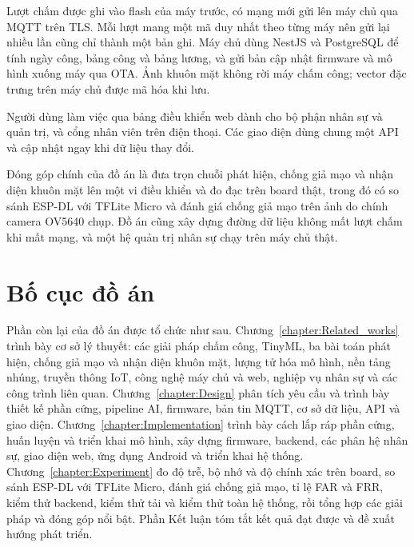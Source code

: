 \documentclass[../DoAn.tex]{subfiles}
\begin{document}
Lượt chấm được ghi vào flash của máy trước, có mạng mới gửi lên máy chủ qua
MQTT trên TLS. Mỗi lượt mang một mã duy nhất theo từng máy nên gửi lại nhiều lần
cũng chỉ thành một bản ghi. Máy chủ dùng NestJS và PostgreSQL để tính ngày công,
bảng công và bảng lương, và gửi bản cập nhật firmware và mô hình xuống máy qua
OTA. Ảnh khuôn mặt không rời máy chấm công; vector đặc trưng trên máy chủ được
mã hóa khi lưu.

Người dùng làm việc qua bảng điều khiển web dành cho bộ phận nhân sự và quản
trị, và cổng nhân viên trên điện thoại. Các giao diện dùng chung một API và cập
nhật ngay khi dữ liệu thay đổi.

Đóng góp chính của đồ án là đưa trọn chuỗi phát hiện, chống giả mạo và nhận diện
khuôn mặt lên một vi điều khiển và đo đạc trên board thật, trong đó có so sánh
ESP-DL với TFLite Micro và đánh giá chống giả mạo trên ảnh do chính camera OV5640
chụp. Đồ án cũng xây dựng đường dữ liệu không mất lượt chấm khi mất mạng, và một
hệ quản trị nhân sự chạy trên máy chủ thật.

\section{Bố cục đồ án}
\label{section:1.4}

Phần còn lại của đồ án được tổ chức như sau.
Chương~\ref{chapter:Related_works} trình bày cơ sở lý thuyết: các giải pháp chấm
công, TinyML, ba bài toán phát hiện, chống giả mạo và nhận diện khuôn mặt, lượng
tử hóa mô hình, nền tảng nhúng, truyền thông IoT, công nghệ máy chủ và web, nghiệp
vụ nhân sự và các công trình liên quan.
Chương~\ref{chapter:Design} phân tích yêu cầu và trình bày thiết kế phần cứng,
pipeline AI, firmware, bản tin MQTT, cơ sở dữ liệu, API và giao diện.
Chương~\ref{chapter:Implementation} trình bày cách lắp ráp phần cứng, huấn luyện
và triển khai mô hình, xây dựng firmware, backend, các phân hệ nhân sự, giao diện
web, ứng dụng Android và triển khai hệ thống.
Chương~\ref{chapter:Experiment} đo độ trễ, bộ nhớ và độ chính xác trên board, so
sánh ESP-DL với TFLite Micro, đánh giá chống giả mạo, tỉ lệ FAR và FRR, kiểm thử
backend, kiểm thử tải và kiểm thử toàn hệ thống, rồi tổng hợp các giải pháp và
đóng góp nổi bật.
Phần Kết luận tóm tắt kết quả đạt được và đề xuất hướng phát triển.
\end{document}
